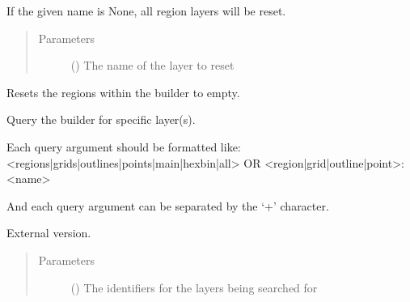 \documentclass[letterpaper,10pt,english]{sphinxmanual}
\begin{document}
\begin{fulllineitems}
\begin{fulllineitems}
\sphinxAtStartPar
If the given name is None, all region layers will be reset.
\begin{quote}\begin{description}
\item[{Parameters}] \leavevmode
\sphinxAtStartPar
{} () \textendash{} The name of the layer to reset

\end{description}\end{quote}

\end{fulllineitems}


\begin{fulllineitems}
\label{\detokenize{builder:geohexviz.builder.PlotBuilder.reset_regions}}
\sphinxAtStartPar
Resets the regions within the builder to empty.

\end{fulllineitems}


\begin{fulllineitems}
\label{\detokenize{builder:geohexviz.builder.PlotBuilder.search}}
\sphinxAtStartPar
Query the builder for specific layer(s).

\sphinxAtStartPar
Each query argument should be formatted like:
\textless{}regions|grids|outlines|points|main|hexbin|all\textgreater{}
OR
\textless{}region|grid|outline|point\textgreater{}:\textless{}name\textgreater{}

\sphinxAtStartPar
And each query argument can be separated by the ‘+’ character.

\sphinxAtStartPar
External version.
\begin{quote}\begin{description}
\item[{Parameters}] \leavevmode
\sphinxAtStartPar
{} () \textendash{} The identifiers for the layers being searched for


\end{description}
\end{quote}
\end{fulllineitems}
\end{fulllineitems}
\end{document}
